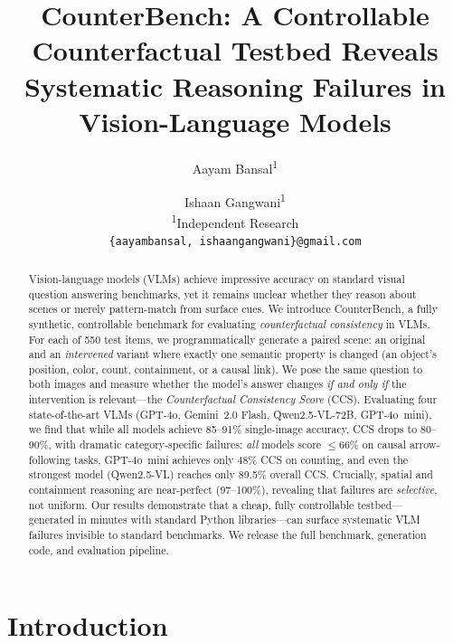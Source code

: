 \documentclass[10pt,twocolumn,letterpaper]{article}
\newcommand{\method}{CounterBench\xspace}
\newcommand{\ccs}{CCS\xspace}
\begin{document}
\title{CounterBench: A Controllable Counterfactual Testbed Reveals\\Systematic Reasoning Failures in Vision-Language Models}

\author{Aayam Bansal\textsuperscript{1} \and Ishaan Gangwani\textsuperscript{1}\\
\textsuperscript{1}Independent Research\\
{\tt\small \{aayambansal, ishaangangwani\}@gmail.com}}

\maketitle

\begin{abstract}
Vision-language models (VLMs) achieve impressive accuracy on standard visual question answering benchmarks, yet it remains unclear whether they reason about scenes or merely pattern-match from surface cues. We introduce \method, a fully synthetic, controllable benchmark for evaluating \emph{counterfactual consistency} in VLMs. For each of 550 test items, we programmatically generate a paired scene: an original and an \emph{intervened} variant where exactly one semantic property is changed (an object's position, color, count, containment, or a causal link). We pose the same question to both images and measure whether the model's answer changes \emph{if and only if} the intervention is relevant---the \emph{Counterfactual Consistency Score} (\ccs). Evaluating four state-of-the-art VLMs (GPT-4o, Gemini~2.0 Flash, Qwen2.5-VL-72B, GPT-4o~mini), we find that while all models achieve 85--91\% single-image accuracy, \ccs drops to 80--90\%, with dramatic category-specific failures: \emph{all} models score $\leq$66\% on causal arrow-following tasks, GPT-4o~mini achieves only 48\% \ccs on counting, and even the strongest model (Qwen2.5-VL) reaches only 89.5\% overall \ccs. Crucially, spatial and containment reasoning are near-perfect (97--100\%), revealing that failures are \emph{selective}, not uniform. Our results demonstrate that a cheap, fully controllable testbed---generated in minutes with standard Python libraries---can surface systematic VLM failures invisible to standard benchmarks. We release the full benchmark, generation code, and evaluation pipeline.
\end{abstract}

\section{Introduction}
\label{sec:intro}
\end{document}
